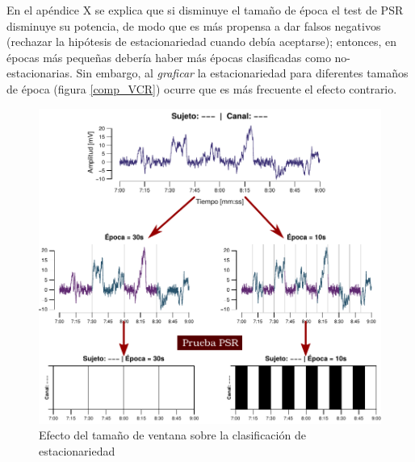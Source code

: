 
En el apéndice X se explica que si disminuye el tamaño de época el test de PSR disminuye su 
potencia, de modo que es más propensa a dar falsos negativos (rechazar la hipótesis de 
estacionariedad cuando debía aceptarse); entonces, en épocas más pequeñas debería haber más épocas 
clasificadas como no-estacionarias.
Sin embargo, al \textit{graficar} la estacionariedad para diferentes tamaños de época (figura
\ref{comp_VCR}) ocurre que es más frecuente el efecto contrario.

\begin{figure}
\centering
\includegraphics[width=\linewidth]{./img_diagramas/epocas_diferentes_v2.pdf}
\caption{Efecto del tamaño de ventana sobre la clasificación de estacionariedad}
\label{epocas_diferentes}
\end{figure}

